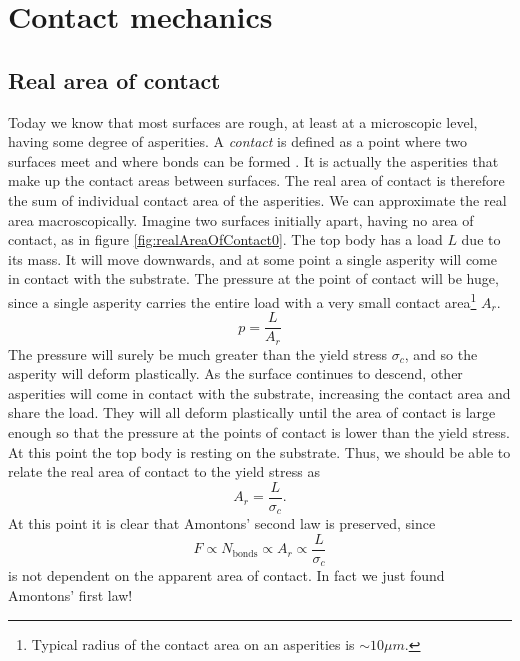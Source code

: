 \documentclass[twoside,english]{uiofysmaster}
\begin{document}
\section{Contact mechanics} \label{sec:contactMechanics}

\subsection{Real area of contact}
Today we know that most surfaces are rough, at least at a microscopic level, having some degree of asperities. 
A \textit{contact} is defined as a point where two surfaces meet and where bonds can be formed \cite{Introduction2Friction}.  
It is actually the asperities that make up the contact areas between surfaces.
The real area of contact is therefore the sum of individual contact area of the asperities. 
We can approximate the real area macroscopically. 
Imagine two surfaces initially apart, having no area of contact, as in figure \ref{fig:realAreaOfContact0}. 
The top body has a load $L$ due to its mass. 
It will move downwards, and at some point a single asperity will come in contact with the substrate.
The pressure at the point of contact will be huge, since a single asperity carries the entire load with a very small contact area\footnote{Typical radius of the contact area on an asperities is $\sim10 \mu m$.} $A_r$.
\begin{equation}
p = \frac{L}{A_r}
\end{equation}
The pressure will surely be much greater than the yield stress $\sigma_c$, and so the asperity will deform plastically. 
As the surface continues to descend, other asperities will come in contact with the substrate, increasing the contact area and share the load. 
They will all deform plastically until the area of contact is large enough so that the pressure at the points of contact is lower than the yield stress.
At this point the top body is resting on the substrate.
Thus, we should be able to relate the real area of contact to the yield stress as
\begin{equation}
A_r =  \frac{L}{\sigma_c}.
\end{equation}
At this point it is clear that Amontons' second law is preserved, since 
\begin{equation}
F\propto N_\text{bonds}\propto A_r \propto \frac{L}{\sigma_c}
\end{equation}
is not dependent on the apparent area of contact. 
In fact we just found Amontons' first law!
\end{document}
